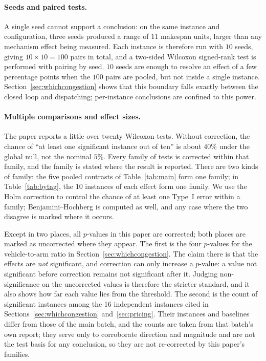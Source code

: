 \documentclass[manuscript,screen,review]{acmart}
\newcommand{\NCases}{10}
\newcommand{\NSeeds}{10}
\newcommand{\NPairs}{100}
\newcommand{\MatrixCells}{16}
\begin{document}
\paragraph{Seeds and paired tests.}
A single seed cannot support a conclusion: on the same instance and configuration, three seeds produced a range of $11$ makespan units, larger than any mechanism effect being measured.
Each instance is therefore run with $\NSeeds$ seeds, giving $\NCases\times\NSeeds=\NPairs$ pairs in total, and a two-sided Wilcoxon signed-rank test is performed with pairing by seed.
$\NSeeds$ seeds are enough to resolve an effect of a few percentage points when the $\NPairs$ pairs are pooled, but not inside a single instance.
Section~\ref{sec:whichcongestion} shows that this boundary falls exactly between the closed loop and dispatching; per-instance conclusions are confined to this power.

\paragraph{Multiple comparisons and effect sizes.}
The paper reports a little over twenty Wilcoxon tests. Without correction, the chance of ``at least one significant instance out of ten'' is about $40\%$ under the global null, not the nominal $5\%$.
Every family of tests is corrected within that family, and the family is stated where the result is reported.
There are two kinds of family: the five pooled contrasts of Table~\ref{tab:main} form one family; in Table~\ref{tab:bytag}, the $\NCases$ instances of each effect form one family.
We use the Holm correction to control the chance of at least one Type~I error within a family; Benjamini--Hochberg is computed as well, and any case where the two disagree is marked where it occurs.

Except in two places, all $p$-values in this paper are corrected; both places are marked as uncorrected where they appear.
The first is the four $p$-values for the vehicle-to-arm ratio in Section~\ref{sec:whichcongestion}. The claim there is that the effects are \emph{not} significant, and correction can only increase a $p$-value: a value not significant before correction remains not significant after it. Judging non-significance on the uncorrected values is therefore the stricter standard, and it also shows how far each value lies from the threshold.
The second is the count of significant instances among the \MatrixCells{} independent instances cited in Sections~\ref{sec:whichcongestion} and~\ref{sec:pricing}. Their instances and baselines differ from those of the main batch, and the counts are taken from that batch's own report; they serve only to corroborate direction and magnitude and are not the test basis for any conclusion, so they are not re-corrected by this paper's families.
\end{document}
